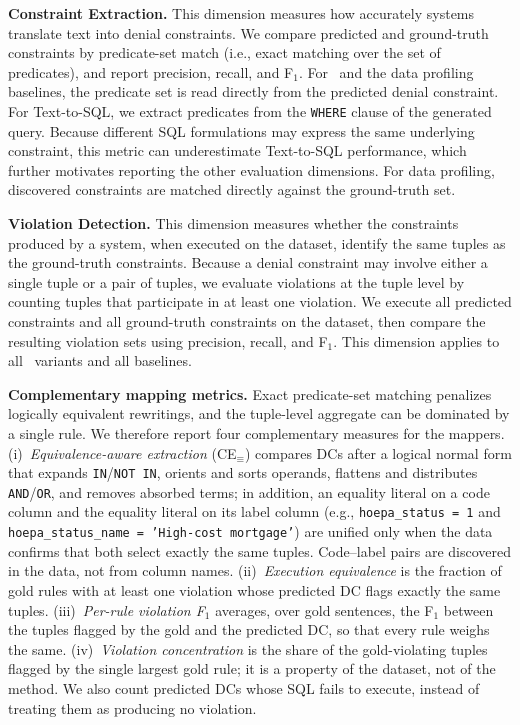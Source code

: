 \smallskip\noindent\textbf{Constraint Extraction.}
This dimension measures how accurately systems translate text into denial
constraints. We compare predicted and ground-truth constraints by
predicate-set match (i.e., exact matching over the set of predicates), and report precision, recall, and F$_1$. For \system\
and the data profiling baselines, the predicate set is read directly from the
predicted denial constraint. For Text-to-SQL, we extract predicates from the
\texttt{WHERE} clause of the generated query. Because different SQL
formulations may express the same underlying constraint, this metric can
underestimate Text-to-SQL performance, which further motivates reporting the
other evaluation dimensions. For data profiling, discovered constraints are
matched directly against the ground-truth set.

\smallskip\noindent\textbf{Violation Detection.}
This dimension measures whether the constraints produced by a system, when
executed on the dataset, identify the same tuples as the
ground-truth constraints. Because a denial constraint may involve either a
single tuple or a pair of tuples, we evaluate violations at the tuple level by
counting tuples that participate in at least one violation. We execute all predicted
constraints and all ground-truth constraints on the dataset, then compare the
resulting violation sets using precision, recall, and F$_1$. This dimension
applies to all \system\ variants and all baselines.


\smallskip\noindent\textbf{Complementary mapping metrics.}
Exact predicate-set matching penalizes logically equivalent rewritings, and the
tuple-level aggregate can be dominated by a single rule. We therefore report
four complementary measures for the mappers. (i)~\emph{Equivalence-aware
extraction} (CE$_{\equiv}$) compares DCs after a logical normal form that expands
\texttt{IN}/\texttt{NOT IN}, orients and sorts operands, flattens and
distributes \texttt{AND}/\texttt{OR}, and removes absorbed terms; in addition,
an equality literal on a code column and the equality literal on its label
column (e.g., \texttt{hoepa\_status = 1} and \texttt{hoepa\_status\_name = 'High-cost
mortgage'}) are unified only when the data confirms that both select exactly the
same tuples. Code--label pairs are discovered in the data, not from column
names. (ii)~\emph{Execution equivalence} is the fraction of gold rules with at
least one violation whose predicted DC flags exactly the same tuples.
(iii)~\emph{Per-rule violation F$_1$} averages, over gold sentences, the F$_1$
between the tuples flagged by the gold and the predicted DC, so that every rule
weighs the same. (iv)~\emph{Violation concentration} is the share of the
gold-violating tuples flagged by the single largest gold rule; it is a property
of the dataset, not of the method. We also count predicted DCs whose SQL fails
to execute, instead of treating them as producing no violation.


